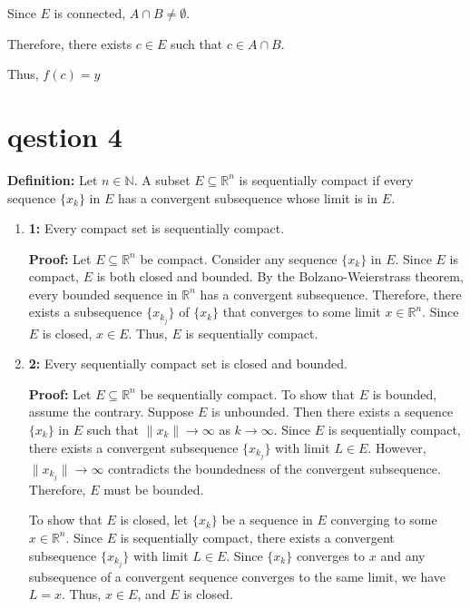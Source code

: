 \documentclass{article}
\begin{document}
Since \( E \) is connected, \( A \cap B \neq \emptyset \).

Therefore, there exists \( c \in E \) such that \( c \in A \cap B \).

Thus, \( f(c) = y \)


\section{qestion 4}
\textbf{Definition:} Let \( n \in \mathbb{N} \). A subset \( E \subseteq \mathbb{R}^n \) is sequentially compact if every sequence \( \{x_k\} \) in \( E \) has a convergent subsequence whose limit is in \( E \).

\begin{enumerate}
    \item \textbf{1:} Every compact set is sequentially compact.
    
    \textbf{Proof:} Let \( E \subseteq \mathbb{R}^n \) be compact. Consider any sequence \( \{x_k\} \) in \( E \). Since \( E \) is compact, \( E \) is both closed and bounded. By the Bolzano-Weierstrass theorem, every bounded sequence in \( \mathbb{R}^n \) has a convergent subsequence. Therefore, there exists a subsequence \( \{x_{k_j}\} \) of \( \{x_k\} \) that converges to some limit \( x \in \mathbb{R}^n \). Since \( E \) is closed, \( x \in E \). Thus, \( E \) is sequentially compact.
    
    \item \textbf{2:} Every sequentially compact set is closed and bounded.
    
    \textbf{Proof:} Let \( E \subseteq \mathbb{R}^n \) be sequentially compact. To show that \( E \) is bounded, assume the contrary. Suppose \( E \) is unbounded. Then there exists a sequence \( \{x_k\} \) in \( E \) such that \( \|x_k\| \to \infty \) as \( k \to \infty \). Since \( E \) is sequentially compact, there exists a convergent subsequence \( \{x_{k_j}\} \) with limit \( L \in E \). However, \( \|x_{k_j}\| \to \infty \) contradicts the boundedness of the convergent subsequence. Therefore, \( E \) must be bounded.
    
    To show that \( E \) is closed, let \( \{x_k\} \) be a sequence in \( E \) converging to some \( x \in \mathbb{R}^n \). Since \( E \) is sequentially compact, there exists a convergent subsequence \( \{x_{k_j}\} \) with limit \( L \in E \). Since \( \{x_k\} \) converges to \( x \) and any subsequence of a convergent sequence converges to the same limit, we have \( L = x \). Thus, \( x \in E \), and \( E \) is closed.
    

\end{enumerate}
\end{document}
